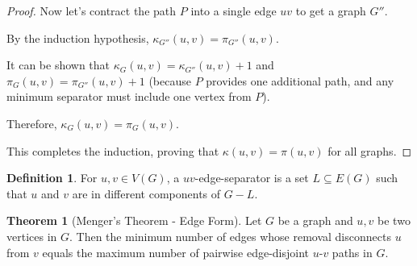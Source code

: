 \documentclass{article}
\theoremstyle{definition}
\newtheorem{theorem}{Theorem}
\newtheorem{definition}{Definition}
\begin{document}
\begin{proof}
Now let's contract the path $P$ into a single edge $uv$ to get a graph $G''$. 

By the induction hypothesis, $\kappa_{G''}(u,v) = \pi_{G''}(u,v)$.

It can be shown that $\kappa_G(u,v) = \kappa_{G''}(u,v) + 1$ and $\pi_G(u,v) = \pi_{G''}(u,v) + 1$ (because $P$ provides one additional path, and any minimum separator must include one vertex from $P$).

Therefore, $\kappa_G(u,v) = \pi_G(u,v)$.

This completes the induction, proving that $\kappa(u,v) = \pi(u,v)$ for all graphs.
\end{proof}

\begin{definition}
For $u,v \in V(G)$, a $uv$-edge-separator is a set $L \subseteq E(G)$ such that $u$ and $v$ are in different components of $G - L$.
\end{definition}


\begin{theorem}[Menger's Theorem - Edge Form]
Let $G$ be a graph and $u,v$ be two vertices in $G$. Then the minimum number of edges whose removal disconnects $u$ from $v$ equals the maximum number of pairwise edge-disjoint $u$-$v$ paths in $G$.
\end{theorem}
\end{document}
